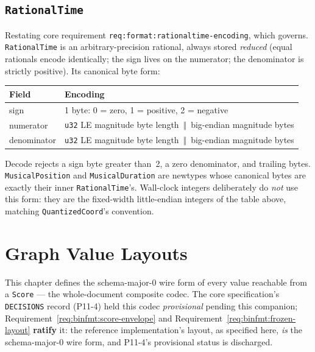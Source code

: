 \documentclass[11pt,letterpaper]{report}
\newcommand{\tablenums}[1]{{\addfontfeatures{Numbers={Lining,Tabular}}#1}}
\newcounter{requirement}[chapter]
\newcommand{\cat}{\ensuremath{\,\Vert\,}}
\begin{document}
\section{\texttt{RationalTime}}
\label{sec:primitives:rationaltime}

Restating core requirement \texttt{req:format:rationaltime-encoding}, which
governs. \texttt{RationalTime} is an arbitrary-precision rational, always
stored \emph{reduced} (equal rationals encode identically; the sign lives on
the numerator; the denominator is strictly positive). Its canonical byte
form:

\begin{center}
\begin{tabular}{l l}
  \toprule
  \textbf{Field} & \textbf{Encoding} \\
  \midrule
  sign & 1 byte: \tablenums{0} = zero, \tablenums{1} = positive,
    \tablenums{2} = negative \\
  numerator & \texttt{u32} LE magnitude byte length \cat{} big-endian
    magnitude bytes \\
  denominator & \texttt{u32} LE magnitude byte length \cat{} big-endian
    magnitude bytes \\
  \bottomrule
\end{tabular}
\end{center}

Decode rejects a sign byte greater than~2, a zero denominator, and trailing
bytes. \texttt{MusicalPosition} and \texttt{MusicalDuration} are newtypes
whose canonical bytes are exactly their inner \texttt{RationalTime}'s.
Wall-clock integers deliberately do \emph{not} use this form: they are the
fixed-width little-endian integers of the table above, matching
\texttt{QuantizedCoord}'s convention.

\chapter{Graph Value Layouts}
\label{ch:values}

This chapter defines the schema-major-0 wire form of every value reachable
from a \texttt{Score} --- the whole-document composite codec. The core
specification's \texttt{DECISIONS} record (P11-4) held this codec
\emph{provisional} pending this companion;
Requirement~\ref{req:binfmt:score-envelope} and
Requirement~\ref{req:binfmt:frozen-layout} \textbf{ratify} it: the reference
implementation's layout, as specified here, \emph{is} the schema-major-0 wire
form, and P11-4's provisional status is discharged.
\end{document}
